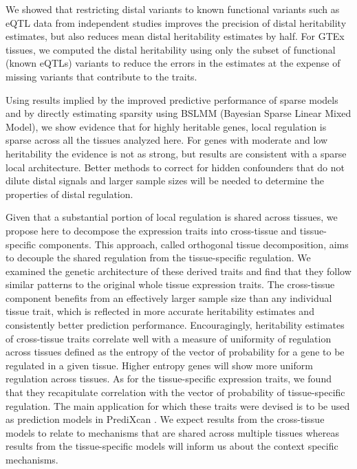 \documentclass[10pt,letterpaper]{article}
\begin{document}
We showed that restricting distal variants to known functional variants such as eQTL data from independent studies improves the precision of distal heritability estimates, but also reduces mean distal heritability estimates by half. For GTEx tissues, we computed the distal heritability using only the subset of functional (known eQTLs) variants to reduce the errors in the estimates at the expense of missing variants that contribute to the traits.

Using results implied by the improved predictive performance of sparse models and by directly estimating sparsity using BSLMM (Bayesian Sparse Linear Mixed Model), we show evidence that for highly heritable genes, local regulation is sparse across all the tissues analyzed here. For genes with moderate and low heritability the evidence is not as strong, but results are consistent with a sparse local architecture. Better methods to correct for hidden confounders that do not dilute distal signals and larger sample sizes will be needed to determine the properties of distal regulation. 

Given that a substantial portion of local regulation is shared across tissues, we propose here to decompose the expression traits into cross-tissue and tissue-specific components. This approach, called orthogonal tissue decomposition, aims to decouple the shared regulation from the tissue-specific regulation. We examined the genetic architecture of these derived traits and find that they follow similar patterns to the original whole tissue expression traits. The cross-tissue component benefits from an effectively larger sample size than any individual tissue trait, which is reflected in more accurate heritability estimates and consistently better prediction performance. Encouragingly, heritability estimates of cross-tissue traits correlate well with a measure of uniformity of regulation across tissues defined as the entropy of the vector of probability for a gene to be regulated in a given tissue. Higher entropy genes will show more uniform regulation across tissues. As for the tissue-specific expression traits, we found that they recapitulate correlation with the vector of probability of tissue-specific regulation. The main application for which these traits were devised is to be used as prediction models in PrediXcan \cite{Gamazon_2015}. We expect results from the cross-tissue models to relate to mechanisms that are shared across multiple tissues whereas results from the tissue-specific models will inform us about the context specific mechanisms. 
\end{document}

